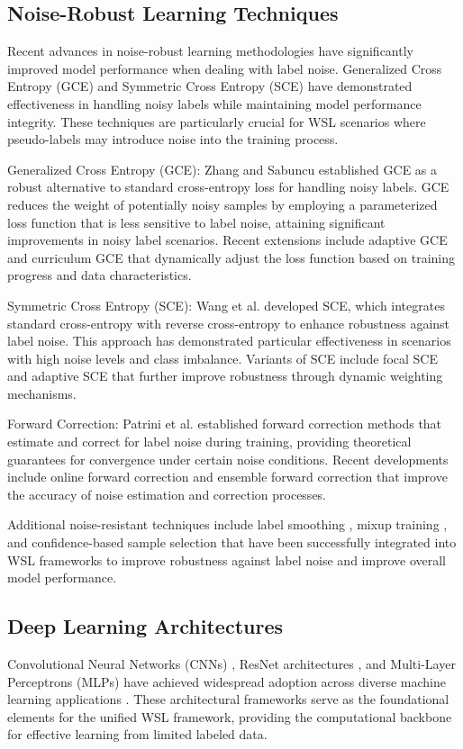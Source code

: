 \documentclass{ieeeaccess}
\begin{document}
\subsection{Noise-Robust Learning Techniques}
Recent advances in noise-robust learning methodologies have significantly improved model performance when dealing with label noise. Generalized Cross Entropy (GCE) \cite{b12} and Symmetric Cross Entropy (SCE) \cite{b13} have demonstrated effectiveness in handling noisy labels while maintaining model performance integrity. These techniques are particularly crucial for WSL scenarios where pseudo-labels may introduce noise into the training process.

Generalized Cross Entropy (GCE): Zhang and Sabuncu \cite{b12} established GCE as a robust alternative to standard cross-entropy loss for handling noisy labels. GCE reduces the weight of potentially noisy samples by employing a parameterized loss function that is less sensitive to label noise, attaining significant improvements in noisy label scenarios. Recent extensions include adaptive GCE \cite{b13} and curriculum GCE \cite{b21} that dynamically adjust the loss function based on training progress and data characteristics.

Symmetric Cross Entropy (SCE): Wang et al. \cite{b13} developed SCE, which integrates standard cross-entropy with reverse cross-entropy to enhance robustness against label noise. This approach has demonstrated particular effectiveness in scenarios with high noise levels and class imbalance. Variants of SCE include focal SCE \cite{b21} and adaptive SCE \cite{b13} that further improve robustness through dynamic weighting mechanisms.

Forward Correction: Patrini et al. \cite{b14} established forward correction methods that estimate and correct for label noise during training, providing theoretical guarantees for convergence under certain noise conditions. Recent developments include online forward correction \cite{b21} and ensemble forward correction \cite{b5} that improve the accuracy of noise estimation and correction processes.

Additional noise-resistant techniques include label smoothing \cite{b13}, mixup training \cite{b21}, and confidence-based sample selection \cite{b5} that have been successfully integrated into WSL frameworks to improve robustness against label noise and improve overall model performance.

\subsection{Deep Learning Architectures}
Convolutional Neural Networks (CNNs) \cite{b9}, ResNet architectures \cite{b10}, and Multi-Layer Perceptrons (MLPs) have achieved widespread adoption across diverse machine learning applications \cite{b28}. These architectural frameworks serve as the foundational elements for the unified WSL framework, providing the computational backbone for effective learning from limited labeled data.
\end{document}
